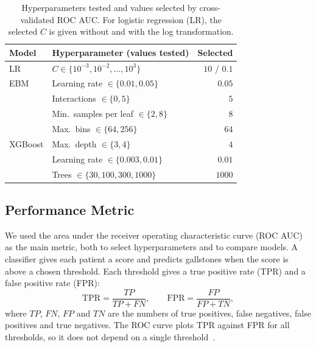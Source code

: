\documentclass[conference]{IEEEtran}
\begin{document}
\begin{table}[htbp]
\centering
\small
\caption{Hyperparameters tested and values selected by cross-validated ROC AUC.
For logistic regression (LR), the selected $C$ is given without and with the
log transformation.}
\label{tab:grids}
\setlength{\tabcolsep}{4pt}
\begin{tabularx}{\linewidth}{@{}l X r@{}}
\toprule
Model & Hyperparameter (values tested) & Selected \\
\midrule
LR      & $C \in \{10^{-3}, 10^{-2}, \ldots, 10^{3}\}$ & $10$ / $0.1$ \\
\midrule
EBM     & Learning rate $\in \{0.01, 0.05\}$           & $0.05$ \\
        & Interactions $\in \{0, 5\}$                  & $5$ \\
        & Min.\ samples per leaf $\in \{2, 8\}$        & $8$ \\
        & Max.\ bins $\in \{64, 256\}$                 & $64$ \\
\midrule
XGBoost & Max.\ depth $\in \{3, 4\}$                   & $4$ \\
        & Learning rate $\in \{0.003, 0.01\}$          & $0.01$ \\
        & Trees $\in \{30, 100, 300, 1000\}$           & $1000$ \\
\bottomrule
\end{tabularx}
\end{table}

\subsection{Performance Metric}
\label{ssec:metric}

We used the area under the receiver operating characteristic curve (ROC AUC) as
the main metric, both to select hyperparameters and to compare models. A
classifier gives each patient a score and predicts gallstones when the score is
above a chosen threshold. Each threshold gives a true positive rate (TPR) and a
false positive rate (FPR):
\begin{equation}
\mathrm{TPR} = \frac{TP}{TP + FN}, \qquad
\mathrm{FPR} = \frac{FP}{FP + TN},
\end{equation}
where $TP$, $FN$, $FP$ and $TN$ are the numbers of true positives, false
negatives, false positives and true negatives. The ROC curve plots TPR against
FPR for all thresholds, so it does not depend on a single
threshold~\cite{fawcett2006roc,google_rocauc}.
\end{document}
